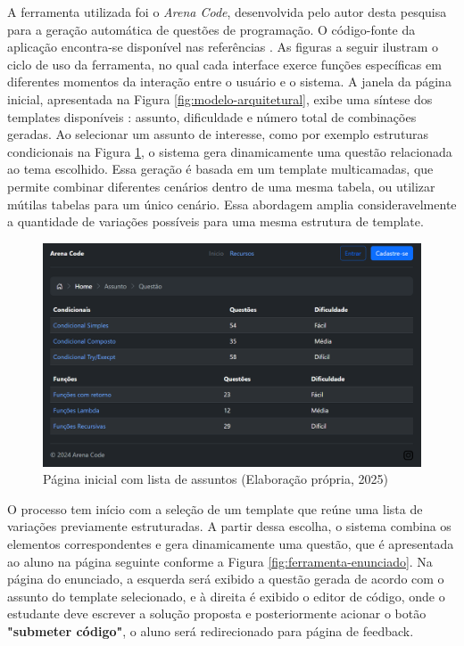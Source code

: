 A ferramenta utilizada foi o \textit{Arena Code}, desenvolvida pelo autor desta pesquisa para a geração automática de questões de programação. O código-fonte da aplicação encontra-se disponível nas referências \parencite{arena-code}.
As figuras a seguir ilustram o ciclo de uso da ferramenta, no qual cada interface exerce funções específicas em diferentes momentos da interação entre o usuário e o sistema. A janela da página inicial, apresentada na Figura \ref{fig:modelo-arquitetural}, exibe uma síntese dos templates disponíveis : assunto, dificuldade e número total de combinações geradas. 
Ao selecionar um assunto de interesse, como por exemplo estruturas condicionais na Figura  \ref{fig:ferramenta-topicos}, o sistema gera dinamicamente uma questão relacionada ao tema escolhido. Essa geração é basada em um template multicamadas, que permite combinar diferentes cenários dentro de uma mesma tabela, ou utilizar mútilas tabelas para um único cenário. Essa abordagem amplia consideravelmente a quantidade de variações possíveis para uma mesma estrutura de template. 
\begin{figure}[H]
  \centering
  \includegraphics[width=\textwidth]{./imagens/capitulo7/ferramenta-fig1}
  \caption{Página inicial com lista de assuntos (Elaboração própria, 2025)}\label{fig:ferramenta-topicos}
\end{figure}


O processo tem início com a seleção de um template que reúne uma lista de variações previamente estruturadas. A partir dessa escolha, o sistema combina os elementos correspondentes e gera dinamicamente uma questão, que é apresentada ao aluno na página seguinte conforme a Figura \ref{fig:ferramenta-enunciado}.  Na página do enunciado, a esquerda será exibido a questão gerada de acordo com o assunto do template selecionado, e à direita é exibido o editor de código, onde o estudante deve escrever a solução proposta e posteriormente acionar o botão \textbf{"submeter código"}, o aluno será redirecionado para página de feedback. 

